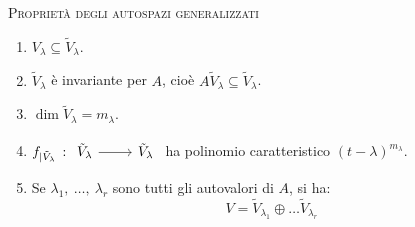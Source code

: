 \begin{lemming}\textsc{Proprietà degli autospazi generalizzati}
	\begin{enumerate}
		\item $V_\lambda\subseteq \tilde{V}_{\lambda}$.
		\item $\tilde{V}_{\lambda}$ è invariante per $A$, cioè $A\tilde{V}_{\lambda}\subseteq \tilde{V}_{\lambda}$.
		\item $\dim \tilde{V}_{\lambda}=m_{\lambda}$.
		\item $f_{\mid\tilde V_{\lambda}}\ \colon\funz{\ }{\tilde{V}_{\lambda}}{\tilde{V}_{\lambda}}$ ha polinomio caratteristico $\left(t-\lambda\right)^{m_{\lambda}}$.
		\item Se $\lambda_1,\ \ldots,\ \lambda_r$ sono tutti gli autovalori di $A$, si ha:
		\begin{equation}
			V=\tilde{V}_{\lambda_1}\oplus\dots\tilde{V}_{\lambda_r}
		\end{equation}
	\end{enumerate}
\vspace{-6mm}
\end{lemming}
